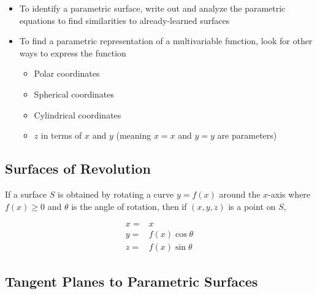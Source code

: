 \documentclass{package/notes}
\begin{document}
\begin{itemize}
	\item To identify a parametric surface, write out and analyze the parametric equations to find similarities to already-learned surfaces
	\item To find a parametric representation of a multivariable function, look for other ways to express the function
	\begin{itemize}
		\item Polar coordinates
		\item Spherical coordinates
		\item Cylindrical coordinates
		\item $z$ in terms of $x$ and $y$ (meaning $x = x$ and $y = y $ are parameters)
	\end{itemize}
\end{itemize}


\subsection{Surfaces of Revolution}

If a surface $S$ is obtained by rotating a curve $y = f(x)$ around the $x$-axis where $f(x)\ge0$ and $\theta$ is the angle of rotation, then if $(x,y,z)$ is a point on $S$, 

$$
\begin{aligned}
	x =&x \\
y =& f(x)\cos\theta\\
z =& f(x)\sin\theta
\end{aligned}
$$



\subsection{Tangent Planes to Parametric Surfaces}
\end{document}
